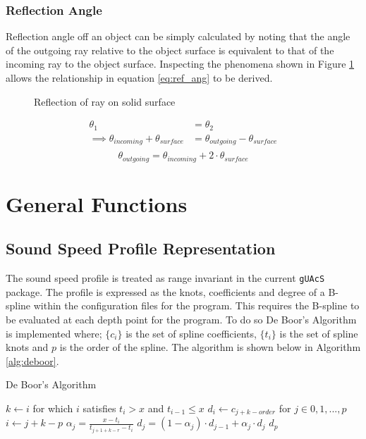 \documentclass{article}
\begin{document}
\subsubsection{Reflection Angle}
Reflection angle off an object can be simply calculated by noting that the angle of the outgoing ray relative to the object surface is equivalent to that of the incoming ray to the object surface. Inspecting the phenomena shown in Figure \ref{fig:reflect_diagram} allows the relationship in equation \ref{eq:ref_ang} to be derived.
\begin{figure}[H]
  \centering
  
  \caption{Reflection of ray on solid surface}
  \label{fig:reflect_diagram}
\end{figure}
\begin{align*}
  \theta_1 &= \theta_2 \\
  \implies \theta_{incoming} + \theta_{surface} &= \theta_{outgoing} - \theta_{surface}\\   
\end{align*}
\begin{equation}
  \label{eq:ref_ang}
  \theta_{outgoing} = \theta_{incoming} + 2\cdot\theta_{surface}
\end{equation}

\section{General Functions}
\subsection{Sound Speed Profile Representation}
The sound speed profile is treated as range invariant in the current \texttt{gUAcS} package. The profile is expressed as the knots, coefficients and degree of a B-spline within the configuration files for the program. This requires the B-spline to be evaluated at each depth point for the program. To do so De Boor's Algorithm is implemented where; $\{c_{i}\}$ is the set of spline coefficients, $\{t_{i}\}$ is the set of spline knots and $p$ is the order of the spline. The algorithm is shown below in Algorithm \ref{alg:deboor}.
\begin{algorithm}[H]
  \caption{De Boor's Algorithm}
  \label{alg:deboor}
  \begin{algorithmic}
    \State $k\gets i$ for which $i$ satisfies $t_{i} > x$ and $t_{i-1} \leq x$
    \State $d_i\gets c_{j + k -order}$ for $j\in{0,1,...,p}$
        \State $i\gets j + k - p$
        \State $\alpha_j = \frac{x - t_i}{t_{j + 1 + k - r} - t_{i}}$
        \State $d_j = (1 - \alpha_j)\cdot d_{j-1} + \alpha_j\cdot d_{j}$
      \EndFor
    \EndFor
    \Return $d_{p}$
  \end{algorithmic}
\end{algorithm}


\nocite{*}
\printbibliography
\end{document}
